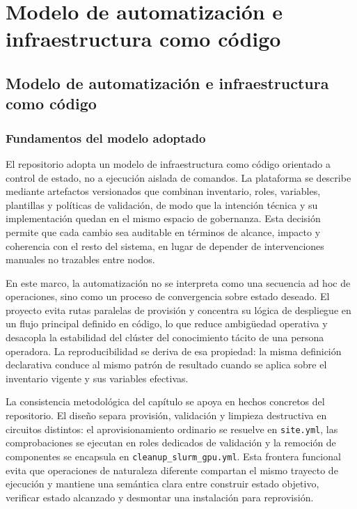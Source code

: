 \chapter{Modelo de automatización e infraestructura como código}
\label{chap:modelo_automatizacion}

\section{Modelo de automatización e infraestructura como código}
\label{sec:modelo_automatizacion_iac}

\subsection{Fundamentos del modelo adoptado}

El repositorio adopta un modelo de infraestructura como código orientado a control de estado, no a ejecución aislada de comandos. La plataforma se describe mediante artefactos versionados que combinan inventario, roles, variables, plantillas y políticas de validación, de modo que la intención técnica y su implementación quedan en el mismo espacio de gobernanza. Esta decisión permite que cada cambio sea auditable en términos de alcance, impacto y coherencia con el resto del sistema, en lugar de depender de intervenciones manuales no trazables entre nodos.

En este marco, la automatización no se interpreta como una secuencia ad hoc de operaciones, sino como un proceso de convergencia sobre estado deseado. El proyecto evita rutas paralelas de provisión y concentra su lógica de despliegue en un flujo principal definido en código, lo que reduce ambigüedad operativa y desacopla la estabilidad del clúster del conocimiento tácito de una persona operadora. La reproducibilidad se deriva de esa propiedad: la misma definición declarativa conduce al mismo patrón de resultado cuando se aplica sobre el inventario vigente y sus variables efectivas.

La consistencia metodológica del capítulo se apoya en hechos concretos del repositorio. El diseño separa provisión, validación y limpieza destructiva en circuitos distintos: el aprovisionamiento ordinario se resuelve en \texttt{site.yml}, las comprobaciones se ejecutan en roles dedicados de validación y la remoción de componentes se encapsula en \texttt{cleanup\_slurm\_gpu.yml}. Esta frontera funcional evita que operaciones de naturaleza diferente compartan el mismo trayecto de ejecución y mantiene una semántica clara entre construir estado objetivo, verificar estado alcanzado y desmontar una instalación para reprovisión.

